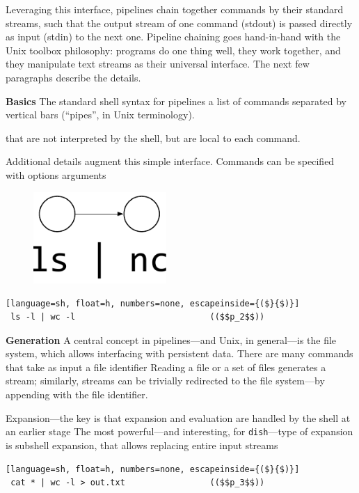 \documentclass[sigplan,10pt,review,anonymous]{acmart}
\newcommand{\heading}[1]{\vspace{4pt}\noindent\textbf{#1}\enspace}
\newcommand{\ttt}[1]{\texttt{\small #1}}
\begin{document}
Leveraging this interface, pipelines chain together commands by their standard streams, such that the output stream of one command (stdout) is passed directly as input (stdin) to the next one.
Pipeline chaining goes hand-in-hand with the Unix toolbox philosophy: 
  programs do one thing well, they work together, and they manipulate text streams as their universal interface.
The next few paragraphs describe the details.


\heading{Basics}
The standard shell syntax for pipelines a list of commands separated by vertical bars (``pipes'', in Unix terminology).

that are not interpreted by the shell, but are local to each command.

Additional details augment this simple interface.
Commands can be specified with options arguments

\begin{figure}[t]
\centering
\includegraphics[width=0.45\textwidth]{./figs/dish_ex1.pdf}
\label{fig:example}
\end{figure}


\begin{lstlisting}[language=sh, float=h, numbers=none, escapeinside={($}{$)}]
 ls -l | wc -l                           (($$p_2$$))
\end{lstlisting}

\heading{Generation}
A central concept in pipelines---and Unix, in general---is the file system, which allows interfacing with persistent data.
There are many commands that take as input a file identifier 
Reading a file or a set of files generates a stream; 
  similarly, streams can be trivially redirected to the file system---by appending with the file identifier.

Expansion---the key is that expansion and evaluation are handled by the shell at an earlier stage 
The most powerful---and interesting, for \ttt{dish}---type of expansion is subshell expansion, that allows replacing entire input streams 


\begin{lstlisting}[language=sh, float=h, numbers=none, escapeinside={($}{$)}]
 cat * | wc -l > out.txt                 (($$p_3$$))
\end{lstlisting}
\end{document}
